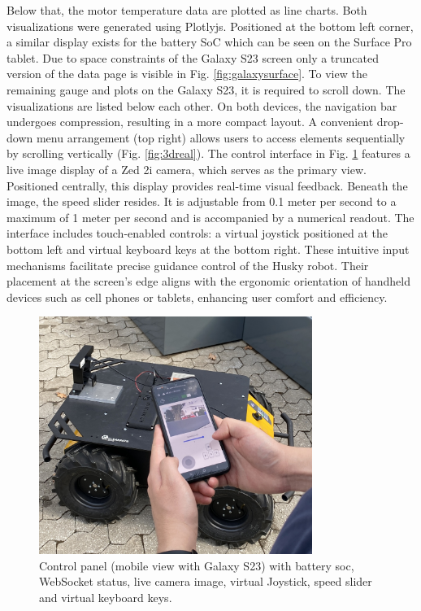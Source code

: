 \documentclass[conference]{IEEEtran}
\begin{document}
Below that, the motor temperature data are plotted as line charts. Both visualizations were generated using Plotlyjs.
Positioned at the bottom left corner, a similar display exists for the battery SoC which can be seen on the Surface Pro tablet. Due to space constraints of the Galaxy S23 screen only a truncated version of the data page is visible in Fig. \ref{fig:galaxysurface}. To view the remaining gauge and plots on the Galaxy S23, it is required to scroll down. The visualizations are listed below each other.  
On both devices, the navigation bar undergoes compression, resulting in a more compact layout.
A convenient drop-down menu arrangement (top right) allows users to access elements sequentially by scrolling vertically (Fig. \ref{fig:3dreal}).
The control interface in Fig. \ref{fig:galaxycontrol} features a live image display of a Zed 2i camera, which serves as the primary view. Positioned centrally, this display provides real-time visual feedback. Beneath the image, the speed slider resides. It is adjustable from 0.1 meter per second to a maximum of 1 meter per second and is accompanied by a numerical readout.
The interface includes touch-enabled controls: a virtual joystick positioned at the bottom left and virtual keyboard keys at the bottom right. These intuitive input mechanisms facilitate precise guidance control of the Husky robot. 
Their placement at the screen's edge aligns with the ergonomic orientation of handheld devices such as cell phones or tablets, enhancing user comfort and efficiency. 
\begin{figure}[htbp]
    \centerline{\includegraphics[width=8.9cm]{Pictures/galaxycontrol.jpg}}
    \caption{Control panel (mobile view with Galaxy S23) with battery soc, WebSocket status, live camera image, virtual Joystick, speed slider and virtual keyboard keys.}
    \label{fig:galaxycontrol}
\end{figure}
\end{document}
